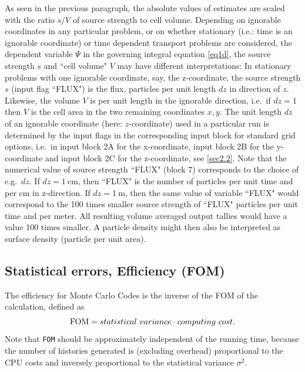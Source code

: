 As seen in the previous paragraph, the absolute values of estimates are scaled
with the ratio $s/V$ of source strength to cell volume.
Depending on ignorable coordinates in any particular problem, or on whether
stationary (i.e.: time is an ignorable coordinate) or time dependent transport
problems are considered, the dependent variable $\Psi$ in the governing
integral equation \cref{eq1d}, the source strength $s$ and ``cell volume" $V$
may have different interpretations:
In stationary problems with one ignorable coordinate, say, the z-coordinate,
the source strength $s$ (input flag ``FLUX") is the flux, particles per unit
length $dz$ in direction of $z$.
Likewise, the volume $V$ is per unit length in the ignorable direction, i.e.\
if $dz=1$ then $V$ is the cell area in the two remaining coordinates $x,y$.
The unit length $dz$ of an ignorable coordinate (here: $z$-coordinate) used in
a particular run is determined by the input flags in the corresponding input
block for standard grid options, i.e.\ in input block 2A for the x-coordinate,
input block 2B for the y-coordinate and input block 2C for the z-coordinate,
see \cref{sec2.2}.
Note that the numerical value of source strength ``FLUX" (block 7) corresponds
to the choice of e.g.\ $dz$.
If $dz=\SI{1}{\centi\metre}$, then ``FLUX" is the number of particles per unit
time and per \si{\centi\metre} in z-direction.
If $dz=\SI{1}{\metre}$, then the same value of variable ``FLUX" would
correspond to the 100 times smaller source strength of ``FLUX" particles per
unit time and per meter.
All resulting volume averaged output tallies would have a value 100 times
smaller.
A particle density might then also be interpreted as surface density (particle
per unit area).

\subsection{Statistical errors, Efficiency (\acs{FOM})} \label{sec1.2.1}

The efficiency for Monte Carlo Codes is the inverse of the \ac{FOM} of the
calculation, defined as
\begin{equation}
  \label{eq1.13} \lstinline|FOM|
  = statistical \ variance    \cdot  computing \ cost.
\end{equation}
Note that \lstinline|FOM| should be approximately independent of the
running time, because the number of histories generated is (excluding overhead)
proportional to the CPU costs and inversely proportional to the statistical
variance $\sigma^2$.

